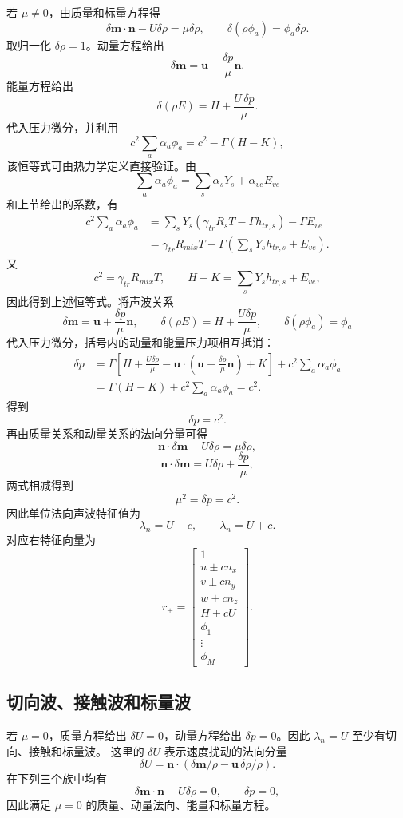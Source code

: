 \documentclass[11pt,a4paper,fontset=fandol]{ctexart}
\newcommand{\ve}{ve}
\newcommand{\tr}{tr}
\newcommand{\nn}{\bm{n}}
\newcommand{\uu}{\bm{u}}
\newcommand{\Gammaone}{\Gamma}
\begin{document}
若 \(\mu\ne0\)，由质量和标量方程得
\[
\delta\bm{m}\cdot\nn-U\delta\rho=\mu\delta\rho,
\qquad
\delta(\rho\phi_a)=\phi_a\delta\rho .
\]
取归一化 \(\delta\rho=1\)。动量方程给出
\[
\delta\bm{m}=\uu+\frac{\delta p}{\mu}\nn .
\]
能量方程给出
\[
\delta(\rho E)=H+\frac{U\,\delta p}{\mu}.
\]
代入压力微分，并利用
\[
c^2\sum_a\alpha_a\phi_a
=c^2-\Gammaone\left(H-K\right),
\]
该恒等式可由热力学定义直接验证。由
\[
\sum_a\alpha_a\phi_a
=\sum_s\alpha_sY_s+\alpha_{\ve}E_{\ve}
\]
和上节给出的系数，有
\[
\begin{aligned}
c^2\sum_a\alpha_a\phi_a
&=\sum_sY_s(\gamma_{\tr}R_sT-\Gammaone h_{\tr,s})
  -\Gammaone E_{\ve}\\
&=\gamma_{\tr}R_{mix}T
  -\Gammaone\left(\sum_sY_sh_{\tr,s}+E_{\ve}\right).
\end{aligned}
\]
又
\[
c^2=\gamma_{\tr}R_{mix}T,\qquad
H-K=\sum_sY_sh_{\tr,s}+E_{\ve},
\]
因此得到上述恒等式。将声波关系
\[
\delta\bm{m}=\uu+\frac{\delta p}{\mu}\nn,\qquad
\delta(\rho E)=H+\frac{U\delta p}{\mu},\qquad
\delta(\rho\phi_a)=\phi_a
\]
代入压力微分，括号内的动量和能量压力项相互抵消：
\[
\begin{aligned}
\delta p
&=\Gammaone\left[
H+\frac{U\delta p}{\mu}
-\uu\cdot\left(\uu+\frac{\delta p}{\mu}\nn\right)+K
\right]
+c^2\sum_a\alpha_a\phi_a\\
&=\Gammaone(H-K)+c^2\sum_a\alpha_a\phi_a=c^2 .
\end{aligned}
\]
得到
\[
\delta p=c^2 .
\]
再由质量关系和动量关系的法向分量可得
\[
\nn\cdot\delta\bm{m}-U\delta\rho=\mu\delta\rho,
\]
\[
\nn\cdot\delta\bm{m}
=U\delta\rho+\frac{\delta p}{\mu},
\]
两式相减得到
\[
\mu^2=\delta p=c^2.
\]
因此单位法向声波特征值为
\[
\lambda_n=U-c,\qquad \lambda_n=U+c.
\]
对应右特征向量为
\[
r_{\pm}=
\begin{bmatrix}
1\\
u\pm cn_x\\
v\pm cn_y\\
w\pm cn_z\\
H\pm cU\\
\phi_1\\
\vdots\\
\phi_M
\end{bmatrix}.
\]

\subsection{切向波、接触波和标量波}

若 \(\mu=0\)，质量方程给出 \(\delta U=0\)，动量方程给出
\(\delta p=0\)。因此 \(\lambda_n=U\) 至少有切向、接触和标量波。
这里的 \(\delta U\) 表示速度扰动的法向分量
\[
\delta U=\nn\cdot(\delta\bm{m}/\rho-\uu\,\delta\rho/\rho).
\]
在下列三个族中均有
\[
\delta\bm{m}\cdot\nn-U\delta\rho=0,
\qquad \delta p=0,
\]
因此满足 \(\mu=0\) 的质量、动量法向、能量和标量方程。
\end{document}
